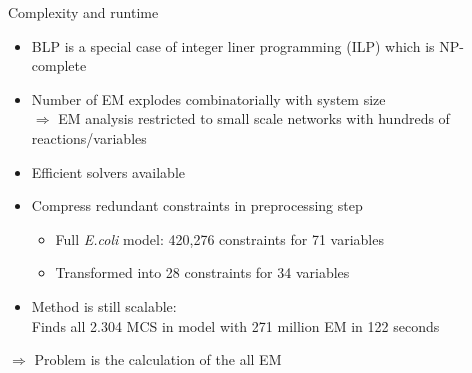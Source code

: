 \documentclass{beamer}
\begin{document}
\begin{frame}{Complexity and runtime}
\begin{itemize}
	\item BLP is a special case of integer liner programming (ILP) which is NP-complete 
	\item Number of EM explodes combinatorially with system size \\
	 $\Rightarrow$ EM analysis restricted to 
	small scale networks with hundreds of reactions/variables
\pause	
    \item Efficient solvers available 
    \item Compress redundant constraints in preprocessing step 
	\begin{itemize}
		\item Full \emph{E.coli} model: 420,276 constraints for 71 variables
		\item Transformed into 28 constraints for 34 variables
	\end{itemize}
	\item Method is still scalable: \\
	Finds all 2.304 MCS in model with 271 million EM in 122 seconds 
\end{itemize}
$\Rightarrow$ Problem is the calculation of the all EM
\end{frame}




\end{document}
